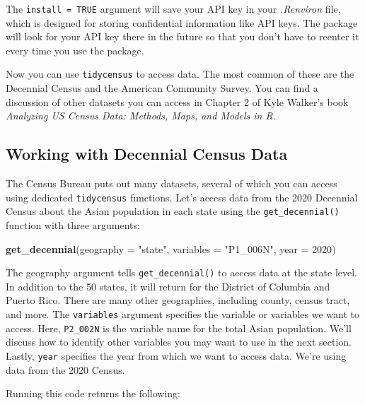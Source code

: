\documentclass[
]{book}
\newenvironment{Shaded}{\begin{snugshade}}{\end{snugshade}}
\newcommand{\AttributeTok}[1]{\textcolor[rgb]{0.13,0.29,0.53}{#1}}
\newcommand{\DecValTok}[1]{\textcolor[rgb]{0.00,0.00,0.81}{#1}}
\newcommand{\FunctionTok}[1]{\textcolor[rgb]{0.13,0.29,0.53}{\textbf{#1}}}
\newcommand{\NormalTok}[1]{#1}
\newcommand{\StringTok}[1]{\textcolor[rgb]{0.31,0.60,0.02}{#1}}
\begin{document}
The \texttt{install\ =\ TRUE} argument will save your API key in your \emph{.Renviron} file, which is designed for storing confidential information like API keys. The package will look for your API key there in the future so that you don't have to reenter it every time you use the package.

Now you can use \texttt{tidycensus} to access data. The most common of these are the Decennial Census and the American Community Survey. You can find a discussion of other datasets you can access in Chapter 2 of Kyle Walker's book \emph{Analyzing US Census Data: Methods, Maps, and Models in R}.

\hypertarget{working-with-decennial-census-data}{%
\subsection*{Working with Decennial Census Data}\label{working-with-decennial-census-data}}

The Census Bureau puts out many datasets, several of which you can access using dedicated \texttt{tidycensus} functions. Let's access data from the 2020 Decennial Census about the Asian population in each state using the \texttt{get\_decennial()} function with three arguments:

\begin{Shaded}
\begin{Highlighting}[]
\FunctionTok{get\_decennial}\NormalTok{(}\AttributeTok{geography =} \StringTok{"state"}\NormalTok{, }
              \AttributeTok{variables =} \StringTok{"P1\_006N"}\NormalTok{,}
              \AttributeTok{year =} \DecValTok{2020}\NormalTok{)}
\end{Highlighting}
\end{Shaded}

The geography argument tells \texttt{get\_decennial()} to access data at the state level. In addition to the 50 states, it will return for the District of Columbia and Puerto Rico. There are many other geographies, including county, census tract, and more. The \texttt{variables} argument specifies the variable or variables we want to access. Here, \texttt{P2\_002N} is the variable name for the total Asian population. We'll discuss how to identify other variables you may want to use in the next section. Lastly, \texttt{year} specifies the year from which we want to access data. We're using data from the 2020 Census.

Running this code returns the following:
\end{document}
